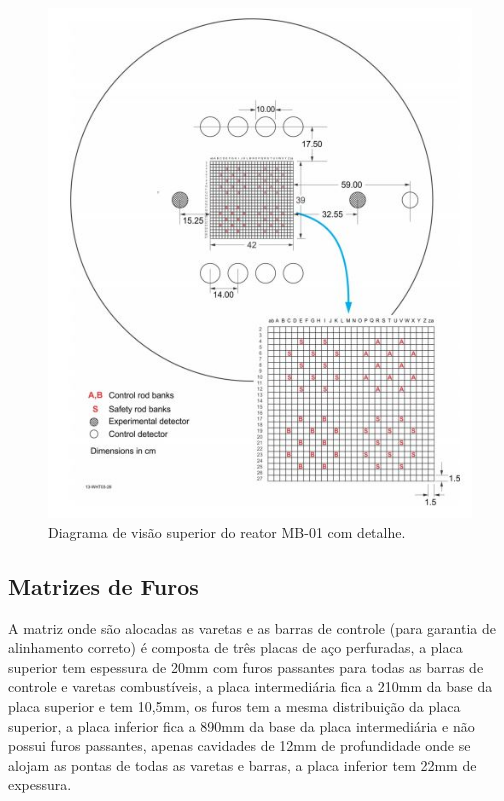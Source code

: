 \documentclass[
	12pt,				%
	openany,			%
	twoside,			%
	a4paper,			%
	english,			%
	french,				%
	spanish,			%
	brazil				%
	]{abntex2}
\begin{document}
\begin{figure}[htpb]
	\caption{\label{topreactor}Diagrama de visão superior do reator MB-01 com detalhe.}
	\begin{center}
	    \includegraphics[scale=1]{figs/Reactor_TOP_VIEW}
	\end{center}
\end{figure}
\newpage

\subsection{Matrizes de Furos}

A matriz onde são alocadas as varetas e as barras de controle (para garantia de alinhamento correto) é composta de três placas de aço perfuradas, a placa superior tem espessura de 20mm com furos passantes para todas as barras de controle e varetas combustíveis, a placa intermediária fica a 210mm da base da placa superior e tem 10,5mm, os furos tem a mesma distribuição da placa superior, a placa inferior fica a 890mm da base da placa intermediária e não possui furos passantes, apenas cavidades de 12mm de profundidade onde se alojam as pontas de todas as varetas e barras, a placa inferior tem 22mm de expessura. 
\end{document}
